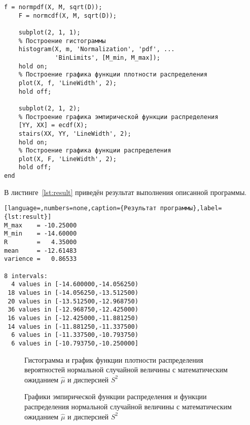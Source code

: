 \begin{lstlisting}[caption={Текст программы},label={lst:programm}]
    f = normpdf(X, M, sqrt(D));
    F = normcdf(X, M, sqrt(D));

    subplot(2, 1, 1);
    % Построение гистограммы
    histogram(X, m, 'Normalization', 'pdf', ...
              'BinLimits', [M_min, M_max]);
    hold on;
    % Построение графика функции плотности распределения
    plot(X, f, 'LineWidth', 2);
    hold off;

    subplot(2, 1, 2);
    % Построение графика эмпирической функции распределения
    [YY, XX] = ecdf(X);
    stairs(XX, YY, 'LineWidth', 2);
    hold on;
    % Построение графика функции распределения
    plot(X, F, 'LineWidth', 2);
    hold off;
end
\end{lstlisting}

В листинге~\ref{lst:result} приведён результат выполнения описанной программы.
\begin{lstlisting}[language=,numbers=none,caption={Результат программы},label={lst:result}]
M_max    = -10.25000
M_min    = -14.60000
R        =   4.35000
mean     = -12.61483
varience =   0.86533

8 intervals:
  4 values in [-14.600000,-14.056250)
 18 values in [-14.056250,-13.512500)
 20 values in [-13.512500,-12.968750)
 36 values in [-12.968750,-12.425000)
 16 values in [-12.425000,-11.881250)
 14 values in [-11.881250,-11.337500)
  6 values in [-11.337500,-10.793750)
  6 values in [-10.793750,-10.250000]
\end{lstlisting}

\begin{figure}[H]
    \caption{Гистограмма и график функции плотности распределения вероятностей нормальной случайной величины с математическим ожиданием $\hat \mu$ и дисперсией $S^2$}\label{img:plot01}

    
\end{figure}

\begin{figure}[H]
    \caption{Графики эмпирической функции распределения и функции распределения нормальной случайной величины с математическим ожиданием $\hat \mu$ и дисперсией $S^2$}\label{img:plot02}
    
\end{figure}

